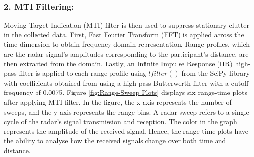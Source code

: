 \documentclass{l4proj}
\begin{document}
\subsubsection{2. MTI Filtering:}
Moving Target Indication (MTI) filter is then used to suppress stationary clutter in the collected data. First, Fast Fourier Transform (FFT) is applied across the time dimension to obtain frequency-domain representation. Range profiles, which are the radar signal's amplitudes corresponding to the participant's distance, are then extracted from the domain. Lastly, an Infinite Impulse Response (IIR) high-pass filter is applied to each range profile using $lfilter()$ from the SciPy library with coefficients obtained from using a high-pass Butterworth filter with a cutoff frequency of 0.0075. Figure \ref{fig:Range-Sweep Plots} displays six range-time plots after applying MTI filter. In the figure, the x-axis represents the number of sweeps, and the y-axis represents the range bins. A radar sweep refers to a single cycle of the radar’s signal transmission and reception. The color in the graph represents the amplitude of the received signal. Hence, the range-time plots have the ability to analyse how the received signals change over both time and distance. 
\end{document}
